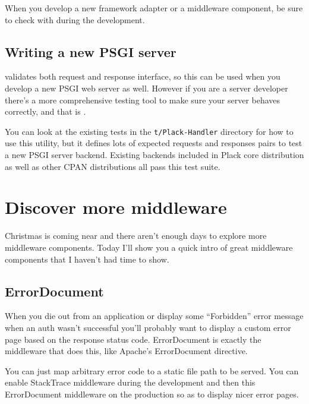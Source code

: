 When you develop a new framework adapter or a middleware component, be
sure to check with  during the development.

\section{Writing a new PSGI server}\label{writing-a-new-psgi-server}

 validates both request and response interface, so this
can be used when you develop a new PSGI web server as well. However if
you are a server developer there's a more comprehensive testing tool to
make sure your server behaves correctly, and that is .

You can look at the existing tests in the \lstinline!t/Plack-Handler!
directory for how to use this utility, but it defines lots of expected
requests and responses pairs to test a new PSGI server backend. Existing
 backends included in Plack core distribution as well as
other CPAN distributions all pass this test suite.

\chapter{Discover more
middleware}\label{day-22-discover-more-middleware}

Christmas is coming near and there aren't enough days to explore more
middleware components. Today I'll show you a quick intro of great
middleware components that I haven't had time to show.

\section{ErrorDocument}\label{errordocument}

When you die out from an application or display some ``Forbidden'' error
message when an auth wasn't successful you'll probably want to display a
custom error page based on the response status code. ErrorDocument is
exactly the middleware that does this, like Apache's ErrorDocument
directive.


You can just map arbitrary error code to a static file path to be
served. You can enable StackTrace middleware during the development and
then this ErrorDocument middleware on the production so as to display
nicer error pages.


